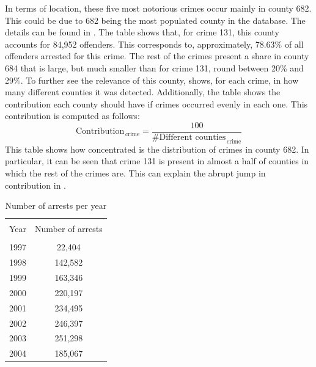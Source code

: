 \documentclass[11pt, english]{article}
\begin{document}
\begin{multicols}{2}
In terms of location, these five most notorious crimes occur mainly in county 682. This could be due to 682 being the most populated county in the database. The details can be found in . The table shows that, for crime 131, this county accounts for 84,952 offenders. This corresponds to, approximately, 78.63\% of all offenders arrested for this crime. The rest of the crimes present a share in county 684 that is large, but much smaller than for crime 131, round between 20\% and 29\%. To further see the relevance of this county,  shows, for each crime, in how many different counties it was detected. Additionally, the table shows the contribution each county should have if crimes occurred evenly in each one. This contribution is computed as follows:
  $$ \text{Contribution}_{\,\text{crime}} = \frac{100}{\text{\# Different counties}_{\,\text{crime}}} $$
This table shows how concentrated is the distribution of crimes in county 682. In particular, it can be seen that crime 131 is present in almost a half of counties in which the rest of the crimes are. This can explain the abrupt jump in contribution in . 


 

\begin{table}
	\caption{Number of arrests per year}
	\label{tab:crimes-per-year}
	\centering
	\begin{tabular}{cc}
		\hline\hline
		\\[-1.5ex]
		Year	&	Number of arrests	\\[0.5ex]\hline
		\\[-1.5ex]
		1997	&	\hspace{1ex}22,404	\\[0.2ex]
		1998	&	142,582				\\[0.2ex]
		1999	&	163,346				\\[0.2ex]
		2000	&	220,197				\\[0.2ex]
		2001	&	234,495				\\[0.2ex]
		2002	&	246,397				\\[0.2ex]
		2003	&	251,298				\\[0.2ex]
		2004	&	185,067				\\[0.5ex]
		\hline\hline
	\end{tabular}
	

\end{table}


\end{multicols}
\end{document}
